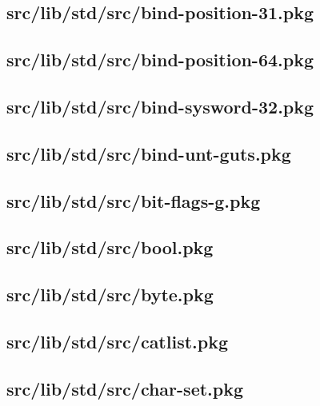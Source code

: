 \subsection{src/lib/std/src/bind-position-31.pkg}


\subsection{src/lib/std/src/bind-position-64.pkg}


\subsection{src/lib/std/src/bind-sysword-32.pkg}


\subsection{src/lib/std/src/bind-unt-guts.pkg}


\subsection{src/lib/std/src/bit-flags-g.pkg}


\subsection{src/lib/std/src/bool.pkg}


\subsection{src/lib/std/src/byte.pkg}


\subsection{src/lib/std/src/catlist.pkg}


\subsection{src/lib/std/src/char-set.pkg}


